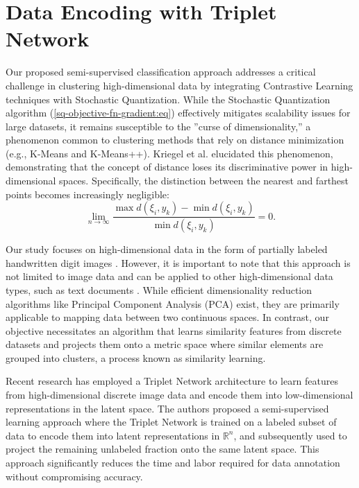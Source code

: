 \section{Data Encoding with Triplet Network}

Our proposed semi-supervised classification approach addresses a critical challenge in clustering high-dimensional data by integrating Contrastive Learning techniques \cite{Hoffer_2015,Khosla_2020} with Stochastic Quantization. While the Stochastic Quantization algorithm (\ref{sq-objective-fn-gradient:eq}) effectively mitigates scalability issues for large datasets, it remains susceptible to the ''curse of dimensionality,'' a phenomenon common to clustering methods that rely on distance minimization (e.g., K-Means and K-Means++). Kriegel et al. \cite{Kriegel_Kröger_Zimek_2009} elucidated this phenomenon, demonstrating that the concept of distance loses its discriminative power in high-dimensional spaces. Specifically, the distinction between the nearest and farthest points becomes increasingly negligible:
\begin{equation}
    \label{dimensions-precision-ratio:eq}
    \lim_{n \to \infty} \frac{\max d(\xi_i, y_k) - \min d(\xi_i, y_k)}{\min d(\xi_i, y_k)} = 0.
\end{equation}

Our study focuses on high-dimensional data in the form of partially labeled handwritten digit images \cite{lecun2010mnist}. However, it is important to note that this approach is not limited to image data and can be applied to other high-dimensional data types, such as text documents \cite{Radomirovic_2023,Widodo_2011}. While efficient dimensionality reduction algorithms like Principal Component Analysis (PCA) \cite{Abdi_Williams_2010,Deisenroth_Faisal_Ong_2020} exist, they are primarily applicable to mapping data between two continuous spaces. In contrast, our objective necessitates an algorithm that learns similarity features from discrete datasets and projects them onto a metric space where similar elements are grouped into clusters, a process known as similarity learning.

Recent research \cite{MURASAKI_ANDO_SHIMAMURA_2022,Turpault_Serizel_Vincent_2019} has employed a Triplet Network architecture to learn features from high-dimensional discrete image data and encode them into low-dimensional representations in the latent space. The authors proposed a semi-supervised learning approach where the Triplet Network is trained on a labeled subset of data to encode them into latent representations in $\mathbb{R}^n$, and subsequently used to project the remaining unlabeled fraction onto the same latent space. This approach significantly reduces the time and labor required for data annotation without compromising accuracy.

